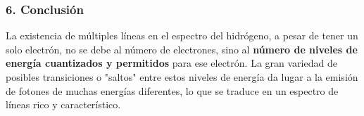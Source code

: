 \subsubsection*{6. Conclusión}
\begin{cajaconclusion}
La existencia de múltiples líneas en el espectro del hidrógeno, a pesar de tener un solo electrón, no se debe al número de electrones, sino al \textbf{número de niveles de energía cuantizados y permitidos} para ese electrón. La gran variedad de posibles transiciones o "saltos" entre estos niveles de energía da lugar a la emisión de fotones de muchas energías diferentes, lo que se traduce en un espectro de líneas rico y característico.
\end{cajaconclusion}
